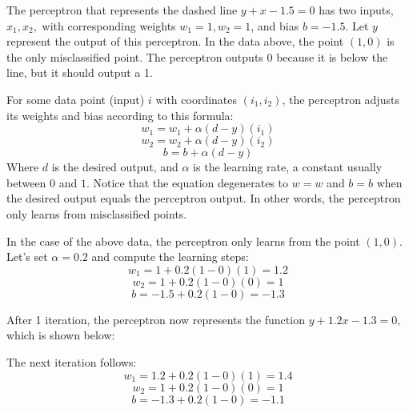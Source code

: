 \documentclass{article}
\begin{document}
The perceptron that represents the dashed line $y+x-1.5=0$ has two inputs, $x_1, x_2,$ with corresponding weights $w_1=1, w_2=1$, and bias $b = -1.5$. Let $y$ represent the output of this perceptron. In the data above, the point $(1, 0)$ is the only misclassified point. The perceptron outputs 0 because it is below the line, but it should output a 1.

For some data point (input) $i$ with coordinates $(i_1, i_2)$, the perceptron adjusts its weights and bias according to this formula:
\[w_1 = w_1 + \alpha(d-y)(i_1)\]
\[w_2 = w_2 + \alpha(d-y)(i_2)\]
\[b = b + \alpha(d-y)\]
Where $d$ is the desired output, and $\alpha$ is the learning rate, a constant usually between $0$ and $1$. Notice that the equation degenerates to $w = w$ and $b=b$ when the desired output equals the perceptron output. In other words, the perceptron only learns from misclassified points.

In the case of the above data, the perceptron only learns from the point $(1, 0)$. Let's set $\alpha=0.2$ and compute the learning steps:
\[w_1 = 1 + 0.2(1-0)(1) = 1.2\]
\[w_2 = 1 + 0.2(1-0)(0) = 1\]
\[b = -1.5 + 0.2(1-0) = -1.3\]

After 1 iteration, the perceptron now represents the function $y+1.2x-1.3 = 0$, which is shown below:
\begin{center}
\end{center}

The next iteration follows:
\[w_1 = 1.2 + 0.2(1-0)(1) = 1.4\]
\[w_2 = 1 + 0.2(1-0)(0) = 1\]
\[b = -1.3 + 0.2(1-0) = -1.1\]

\begin{center}
\end{center}
\end{document}
